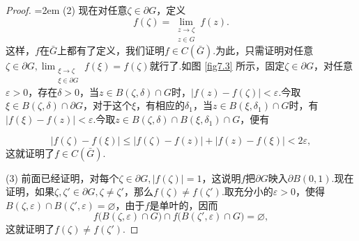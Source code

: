 \begin{proof}
  \noindent\begin{minipage}{0.7\textwidth}\parindent=2em
    (2) \hypertarget{thm7.3.1.2}{}  现在对任意$\zeta\in\partial G$，定义
    \[ 
      f(\zeta) = \lim_{\substack{z\to\zeta\\z\in G}}f(z).
    \]
    这样，$f$在$\bar G$上都有了定义，我们证明$f\in C(\bar G)$.为此，只需证明对任意$\zeta\in\partial G,\lim_{\substack{\xi\to\zeta\\\xi\in \partial G}}f(\xi)=f(\zeta)$就行了.如图
    \ref{fig7.3} 所示，固定$\zeta\in\partial G$，对任意$\varepsilon>0$，存在$\delta>0$，当$z\in B(\zeta,\delta)\cap G$时，$|f(z)-f(\zeta)|<\varepsilon$.今取$\xi\in B(\zeta,\delta)\cap\partial G$，对于这个$\xi$，有相应的$\delta_1$，当$z\in B(\xi,\delta_1)\cap G$时，有$|f(\xi)-f(z)|<\varepsilon$.今取$z\in B(\zeta,\delta)\cap B(\xi,\delta_1)\cap G$，便有
  \end{minipage}
  \begin{minipage}{0.3\textwidth}
    \centering
  \end{minipage}
  \[
    |f(\zeta)-f(\xi)| \le |f(\zeta)-f(z)| + |f(z)-f(\xi)| < 2\varepsilon,
  \]
  这就证明了$f\in C(\bar G)$.

  (3) \hypertarget{thm7.3.1.3}{} 前面已经证明，对每个$\zeta\in\partial G,|f(\zeta)|=1$，这说明$f$把$\partial G$映入$\partial B(0,1)$.现在证明，如果$\zeta,\zeta'\in\partial G,\zeta\ne\zeta'$，那么$f(\zeta)\ne f(\zeta')$.取充分小的$\varepsilon>0$，使得$B(\zeta,\varepsilon)\cap B(\zeta',\varepsilon)=\varnothing$，由于$f$是单叶的，因而
  \[
    f\big(B(\zeta,\varepsilon)\cap G\big)\cap f\big(B(\zeta',\varepsilon)\cap G\big)=
    \varnothing,
  \]
  这就证明了$f(\zeta)\ne f(\zeta')$.


\end{proof}
